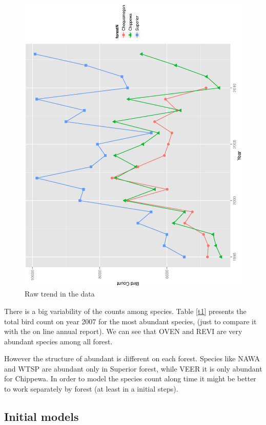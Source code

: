 \documentclass{article}
\begin{document}
\begin{figure}[h!]
\centering
\includegraphics[scale=.4, angle=-90]{rawtrend.ps}
\caption{Raw trend in the data \label{figtr} }
\end{figure}

There is a big variability of the counts among species. Table \ref{t1} presents the total bird count on year 2007 for the most abundant species, (just to compare it with the on line annual report). We can see that OVEN and REVI are very abundant species among all forest. 

However the structure of abundant is different on each forest. Species like NAWA and WTSP are abundant only in Superior forest, while VEER it is only abundant for Chippewa. In order to model the species count along time it might be better to work separately by forest (at least in a initial steps).  




\subsection{Initial models} 
\end{document}
